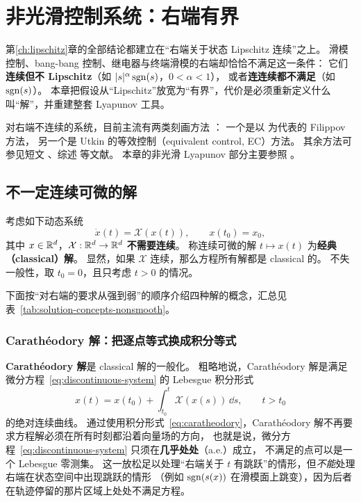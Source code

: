 \chapter{非光滑控制系统：右端有界}\label{ch:bounded}

第\ref{ch:lipschitz}章的全部结论都建立在“右端关于状态 Lipschitz 连续”之上。
滑模控制、bang-bang 控制、继电器与终端滑模的右端却恰恰不满足这一条件：
它们\textbf{连续但不 Lipschitz}（如 $|s|^\alpha\operatorname{sgn}(s)$，$0<\alpha<1$），
或者\textbf{连连续都不满足}（如 $\operatorname{sgn}(s)$）。
本章把假设从“Lipschitz”放宽为“有界”，代价是必须重新定义什么叫“解”，并重建整套 Lyapunov 工具。

对右端不连续的系统，目前主流有两类刻画方法 \cite{poznyakVadimUtkinSliding2023}：
一个是以 \cite{filippovDifferentialEquationsDiscontinuous1988} 为代表的 Filippov 方法，
另一个是 Utkin 的等效控制（equivalent control, EC）方法。
其余方法可参见短文 \cite{utkinBriefCommentsDoubts2022}、综述 \cite{cortesDiscontinuousDynamicalSystems2008} 等文献。
本章的非光滑 Lyapunov 部分主要参照 \cite{shevitzLyapunovStabilityTheory1994,郑凯_基于Filippov微分包含解的非平滑控制系统}。

\section{不一定连续可微的解}\label{sec:nonsmooth-solutions}

考虑如下动态系统
\begin{equation}\label{eq:discontinuous-system}
  \dot{x}(t)=\mathcal{X}(x(t)),\qquad x(t_0)=x_0,
\end{equation}
其中 $x\in\mathbb{R}^d$，$\mathcal{X}:\mathbb{R}^d\to\mathbb{R}^d$ \textbf{不需要连续}。
称连续可微的解 $t\mapsto x(t)$ 为\textbf{经典（classical）解}。
显然，如果 $\mathcal{X}$ 连续，那么方程所有解都是 classical 的。
不失一般性，取 $t_0=0$，且只考虑 $t>0$ 的情况。

下面按“对右端的要求从强到弱”的顺序介绍四种解的概念，汇总见表~\ref{tab:solution-concepts-nonsmooth}。

\subsection{Carathéodory 解：把逐点等式换成积分等式}

\textbf{Carathéodory 解}是 classical 解的一般化。
粗略地说，Carathéodory 解是满足微分方程~\eqref{eq:discontinuous-system} 的 Lebesgue 积分形式
\begin{equation}\label{eq:caratheodory}
  x(t)=x(t_0)+\int_{t_0}^t \mathcal{X}(x(s))\,\dd s,\qquad t>t_0
\end{equation}
的绝对连续曲线。
通过使用积分形式~\eqref{eq:caratheodory}，Carathéodory 解不再要求方程解必须在所有时刻都沿着向量场的方向，
也就是说，微分方程~\eqref{eq:discontinuous-system} 只须在\textbf{几乎处处}（a.e.）成立，
不满足的点可以是一个 Lebesgue 零测集。
这一放松足以处理“右端关于 $t$ 有跳跃”的情形，但\emph{不能}处理右端在状态空间中出现跳跃的情形
（例如 $\operatorname{sgn}(s(x))$ 在滑模面上跳变），因为后者在轨迹停留的那片区域上处处不满足方程。

